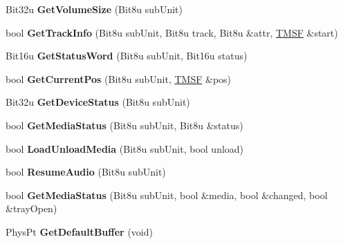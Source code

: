 \begin{DoxyCompactItemize}
\item 
\hypertarget{classCMscdex_a46265444d991ab7a43d8e1483b2fb600}{Bit32u {\bfseries Get\-Volume\-Size} (Bit8u sub\-Unit)}\label{classCMscdex_a46265444d991ab7a43d8e1483b2fb600}

\item 
\hypertarget{classCMscdex_ac484559d3ff51a0fc0ee0cf7df99c899}{bool {\bfseries Get\-Track\-Info} (Bit8u sub\-Unit, Bit8u track, Bit8u \&attr, \hyperlink{structSMSF}{T\-M\-S\-F} \&start)}\label{classCMscdex_ac484559d3ff51a0fc0ee0cf7df99c899}

\item 
\hypertarget{classCMscdex_a438afa22d295857d059828f6002ea2a2}{Bit16u {\bfseries Get\-Status\-Word} (Bit8u sub\-Unit, Bit16u status)}\label{classCMscdex_a438afa22d295857d059828f6002ea2a2}

\item 
\hypertarget{classCMscdex_a1be2e43a7cafc6fbf1f06a6dda72daec}{bool {\bfseries Get\-Current\-Pos} (Bit8u sub\-Unit, \hyperlink{structSMSF}{T\-M\-S\-F} \&pos)}\label{classCMscdex_a1be2e43a7cafc6fbf1f06a6dda72daec}

\item 
\hypertarget{classCMscdex_a2aa20d1b23551d9bf9e6b84a456a53dc}{Bit32u {\bfseries Get\-Device\-Status} (Bit8u sub\-Unit)}\label{classCMscdex_a2aa20d1b23551d9bf9e6b84a456a53dc}

\item 
\hypertarget{classCMscdex_a1367a3db25fb8dba65a59dd879409de5}{bool {\bfseries Get\-Media\-Status} (Bit8u sub\-Unit, Bit8u \&status)}\label{classCMscdex_a1367a3db25fb8dba65a59dd879409de5}

\item 
\hypertarget{classCMscdex_ab54c0b2f0cfc504fb70dc820d35404e2}{bool {\bfseries Load\-Unload\-Media} (Bit8u sub\-Unit, bool unload)}\label{classCMscdex_ab54c0b2f0cfc504fb70dc820d35404e2}

\item 
\hypertarget{classCMscdex_a2ccb8c103a5755b4594698dd155fd6d4}{bool {\bfseries Resume\-Audio} (Bit8u sub\-Unit)}\label{classCMscdex_a2ccb8c103a5755b4594698dd155fd6d4}

\item 
\hypertarget{classCMscdex_abdd75d8019cc9190c34975e1c6e84b47}{bool {\bfseries Get\-Media\-Status} (Bit8u sub\-Unit, bool \&media, bool \&changed, bool \&tray\-Open)}\label{classCMscdex_abdd75d8019cc9190c34975e1c6e84b47}

\item 
\hypertarget{classCMscdex_a7a887c5c48a967fa8c3f1f429478e28f}{Phys\-Pt {\bfseries Get\-Default\-Buffer} (void)}\label{classCMscdex_a7a887c5c48a967fa8c3f1f429478e28f}


\end{DoxyCompactItemize}

